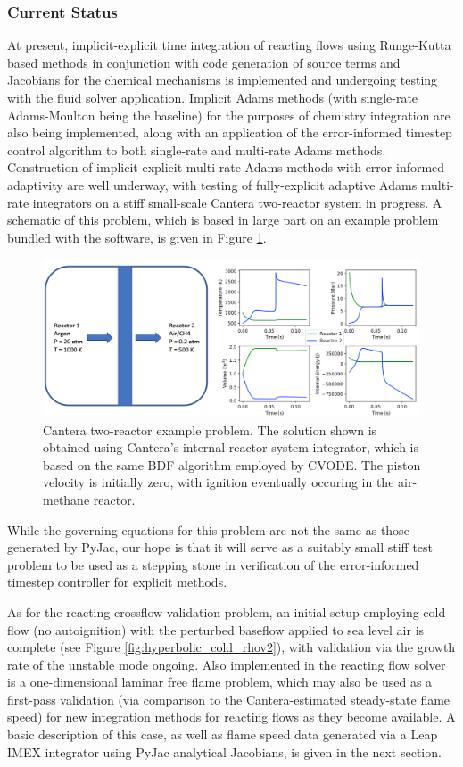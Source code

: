 \subsubsection{Current Status}

At present, implicit-explicit time integration of reacting flows using Runge-Kutta
based methods in conjunction with code generation of source terms and Jacobians for
the chemical mechanisms is implemented and undergoing testing with the fluid solver
application. Implicit Adams methods (with single-rate Adams-Moulton being the baseline)
for the purposes of chemistry integration are also being implemented, along with
an application of the error-informed timestep control algorithm to both
single-rate and multi-rate Adams methods. Construction of implicit-explicit multi-rate
Adams methods with error-informed adaptivity are well underway, with testing
of fully-explicit adaptive Adams multi-rate integrators on a stiff small-scale Cantera
\cite{cantera} two-reactor system in progress. A schematic of this problem, which is
based in large part on an example problem bundled with the software, is given in
Figure \ref{fig:cantera_reactors}.
\begin{figure}
\centering
\includegraphics[width=0.9\linewidth,trim=4 4 4 4,clip]{figures/cantera_reactors_soln.png}
\caption{Cantera two-reactor example problem. The solution shown is obtained using
	 Cantera's internal reactor system integrator, which is based on the same
	 BDF algorithm employed by CVODE. The piston velocity is initially zero,
	 with ignition eventually occuring in the air-methane reactor.}
\label{fig:cantera_reactors}
\end{figure}
While the governing equations for this problem are not the same as those generated
by PyJac, our hope is that it will serve as a suitably small stiff test problem to be
used as a stepping stone in verification of the error-informed timestep controller
for explicit methods.

As for the reacting crossflow validation problem, an initial setup employing
cold flow (no autoignition) with the perturbed baseflow applied to sea level air
is complete (see Figure \ref{fig:hyperbolic_cold_rhov2}), with validation via the
growth rate of the unstable mode ongoing. Also implemented in the reacting flow
solver is a one-dimensional laminar free flame problem, which may also be used
as a first-pass validation (via comparison to the Cantera-estimated steady-state
flame speed) for new integration methods for reacting flows as they become available.
A basic description of this case, as well as flame speed data generated via a Leap
IMEX integrator using PyJac analytical Jacobians, is given in the next section.

